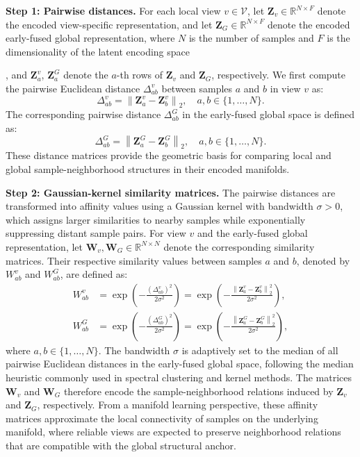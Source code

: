 \documentclass[10pt, journal, compsoc]{IEEEtran}
\newif\ifshowrevision
\newenvironment{revpar}{%
  \ifshowrevision
    \color{blue}%
  \fi
}{}
\begin{document}
\textbf{Step 1: Pairwise distances.}
For each local view $v\in\mathcal{V}$, let $\mathbf{Z}_{v}\in\mathbb{R}^{N\times F}$ denote the encoded view-specific representation, and let $\mathbf{Z}_{G}\in\mathbb{R}^{N\times F}$ denote the encoded early-fused global representation, where $N$ is the number of samples and $F$ is the dimensionality of the latent encoding space\begin{revpar} , and $\mathbf{Z}_{a}^{v}$, $\mathbf{Z}_{a}^{G}$ denote the $a$-th rows of $\mathbf{Z}_{v}$ and $\mathbf{Z}_{G}$, respectively. \end{revpar}We first compute the pairwise Euclidean distance $\Delta_{ab}^{v}$ between samples $a$ and $b$ in view $v$ as:
\begin{equation}
\Delta_{ab}^{v}
=
\left\|
\mathbf{Z}_{a}^{v}
-
\mathbf{Z}_{b}^{v}
\right\|_{2},
\quad
a,b\in\{1,\dots,N\}.
\label{eq:elmc_dist_v}
\end{equation}
The corresponding pairwise distance $\Delta_{ab}^{G}$ in the early-fused global space is defined as:
\begin{equation}
\Delta_{ab}^{G}
=
\left\|
\mathbf{Z}_{a}^{G}
-
\mathbf{Z}_{b}^{G}
\right\|_{2},
\quad
a,b\in\{1,\dots,N\}.
\label{eq:elmc_dist_g}
\end{equation}
These distance matrices provide the geometric basis for comparing local and global sample-neighborhood structures in their encoded manifolds.

\textbf{Step 2: Gaussian-kernel similarity matrices.} The pairwise distances are transformed into affinity values using a Gaussian kernel with bandwidth $\sigma>0$, which assigns larger similarities to nearby samples while exponentially suppressing distant sample pairs. For view $v$ and the early-fused global representation, let $\mathbf{W}_{v},\mathbf{W}_{G}\in\mathbb{R}^{N\times N}$ denote the corresponding similarity matrices. Their respective similarity values between samples $a$ and $b$, denoted by $W_{ab}^{v}$ and $W_{ab}^{G}$, are defined as:
\begin{equation}
\begin{aligned}
W_{ab}^{v}
&=
\exp
\left(
-\frac{(\Delta_{ab}^{v})^2}{2\sigma^2}
\right)
=
\exp
\left(
-\frac{
\left\|
\mathbf{Z}_{a}^{v}
-
\mathbf{Z}_{b}^{v}
\right\|_{2}^{2}
}{2\sigma^2}
\right), \\
W_{ab}^{G}
&=
\exp
\left(
-\frac{(\Delta_{ab}^{G})^2}{2\sigma^2}
\right)
=
\exp
\left(
-\frac{
\left\|
\mathbf{Z}_{a}^{G}
-
\mathbf{Z}_{b}^{G}
\right\|_{2}^{2}
}{2\sigma^2}
\right),
\end{aligned}
\label{eq:elmc_W}
\end{equation}
where $a,b\in\{1,\dots,N\}$. The bandwidth $\sigma$ is adaptively set to the median of all pairwise Euclidean distances in the early-fused global space, following the median heuristic commonly used in spectral clustering and kernel methods. The matrices $\mathbf{W}_{v}$ and $\mathbf{W}_{G}$ therefore encode the sample-neighborhood relations induced by $\mathbf{Z}_{v}$ and $\mathbf{Z}_{G}$, respectively. From a manifold learning perspective, these affinity matrices approximate the local connectivity of samples on the underlying manifold, where reliable views are expected to preserve neighborhood relations that are compatible with the global structural anchor.
\end{document}
